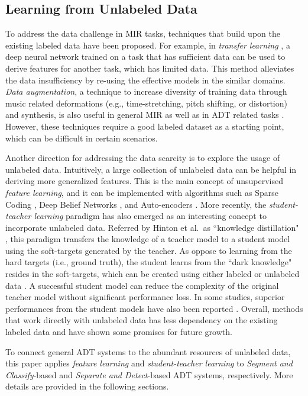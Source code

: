\documentclass{article}
\begin{document}
\subsection{Learning from Unlabeled Data}
\label{subsec:learnFromUnlabeledData}
To address the data challenge in MIR tasks, techniques that build upon the existing labeled data have been proposed. For example, in \textit{transfer learning} \cite{Choi2017a}, a deep neural network trained on a task that has sufficient data can be used to derive features for another task, which has limited data. This method alleviates the data insufficiency by re-using the effective models in the similar domains. \textit{Data augmentation}, a technique to increase diversity of training data through music related deformations (e.g., time-stretching, pitch shifting, or distortion) and synthesis, is also useful in general MIR \cite{Mcfee2015} as well as in ADT related tasks  \cite{Wu2016, Vogl2017_icassp}. However, these techniques require a good labeled dataset as a starting point, which can be difficult in certain scenarios. 

Another direction for addressing the data scarcity is to explore the usage of unlabeled data. Intuitively, a large collection of unlabeled data can be helpful in deriving more generalized features. This is the main concept of unsupervised \textit{feature learning}, and it can be implemented with algorithms such as Sparse Coding \cite{Raina2007a}, Deep Belief Networks \cite{Hamel2010}, and Auto-encoders \cite{Masci2011}. More recently, the \textit{student-teacher learning} paradigm has also emerged as an interesting concept to incorporate unlabeled data. Referred by Hinton et al.~as ``knowledge distillation" \cite{Hinton2015}, this paradigm transfers the knowledge of a teacher model to a student model using the soft-targets generated by the teacher. As oppose to learning from the hard targets (i.e., ground truth), the student learns from the ``dark knowledge" resides in the soft-targets, which can be created using either labeled or unlabeled data \cite{Li2014}. A successful student model can reduce the complexity of the original teacher model without significant performance loss. In some studies, superior performances from the student models have also been reported \cite{Cui2017,Watanabe2017, Wu2017}. Overall, methods that work directly with unlabeled data has less dependency on the existing labeled data and have shown some promises for future growth. 

To connect general ADT systems to the abundant resources of unlabeled data, this paper applies \textit{feature learning} and \textit{student-teacher learning} to \textit{Segment and Classify}-based and \textit{Separate and Detect}-based ADT systems, respectively. More details are provided in the following sections.
\end{document}
